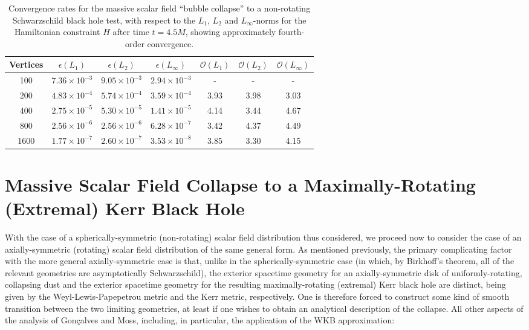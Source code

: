\documentclass{article}
\begin{document}
\begin{table}[ht]
\centering
\begin{tabular}{|c|c|c|c|c|c|c|}
\hline
Vertices & ${\epsilon \left( L_1 \right)}$ & ${\epsilon \left( L_2 \right)}$ & ${\epsilon \left( L_{\infty} \right)}$ & ${\mathcal{O} \left( L_1 \right)}$ & ${\mathcal{O} \left( L_2 \right)}$ & ${\mathcal{O} \left( L_{\infty} \right)}$\\
\hline\hline
100 & ${7.36 \times 10^{-3}}$ & ${9.05 \times 10^{-3}}$ & ${2.94 \times 10^{-3}}$ & - & - & -\\
\hline
200 & ${4.83 \times 10^{-4}}$ & ${5.74 \times 10^{-4}}$ & ${3.59 \times 10^{-4}}$ & 3.93 & 3.98 & 3.03\\
\hline
400 & ${2.75 \times 10^{-5}}$ & ${5.30 \times 10^{-5}}$ & ${1.41 \times 10^{-5}}$ & 4.14 & 3.44 & 4.67\\
\hline
800 & ${2.56 \times 10^{-6}}$ & ${2.56 \times 10^{-6}}$ & ${6.28 \times 10^{-7}}$ & 3.42 & 4.37 & 4.49\\
\hline
1600 & ${1.77 \times 10^{-7}}$ & ${2.60 \times 10^{-7}}$ & ${3.53 \times 10^{-8}}$ & 3.85 & 3.30 & 4.15\\
\hline
\end{tabular}
\caption{Convergence rates for the massive scalar field ``bubble collapse'' to a non-rotating Schwarzschild black hole test, with respect to the ${L_1}$, ${L_2}$ and ${L_{\infty}}$-norms for the Hamiltonian constraint $H$ after time ${t = 4.5 M}$, showing approximately fourth-order convergence.}
\label{tab:Table1}
\end{table}

\clearpage

\section{Massive Scalar Field Collapse to a Maximally-Rotating (Extremal) Kerr Black Hole}
\label{sec:Section3}

With the case of a spherically-symmetric (non-rotating) scalar field distribution thus considered, we proceed now to consider the case of an axially-symmetric (rotating) scalar field distribution of the same general form. As mentioned previously, the primary complicating factor with the more general axially-symmetric case is that, unlike in the spherically-symmetric case (in which, by Birkhoff's theorem, all of the relevant geometries are asymptotically Schwarzschild), the exterior spacetime geometry for an axially-symmetric disk of uniformly-rotating, collapsing dust and the exterior spacetime geometry for the resulting maximally-rotating (extremal) Kerr black hole are distinct, being given by the Weyl-Lewis-Papepetrou metric\cite{weyl}\cite{lewis}\cite{papapetrou} and the Kerr metric, respectively. One is therefore forced to construct some kind of smooth transition between the two limiting geometries, at least if one wishes to obtain an analytical description of the collapse. All other aspects of the analysis of Gon\c{c}alves and Moss\cite{goncalves}, including, in particular, the application of the WKB approximation:
\end{document}
